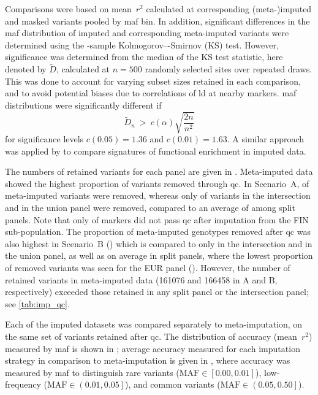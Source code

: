 Comparisons were based on mean~$r^2$ calculated at corresponding (meta-)imputed and masked variants pooled by \gls{maf} bin.
In addition, significant differences in the \gls{maf} distribution of imputed and corresponding meta-imputed variants were determined using the -sample Kolmogorov–-Smirnov (KS) test.
However, significance was determined from the median of the KS test statistic, here denoted by $\widetilde{D}$, calculated at ${n = \num{500}}$ randomly selected sites over  repeated draws.
This was done to account for varying subset sizes retained in each comparison, and to avoid potential biases due to correlations of \gls{ld} at nearby markers.
\Gls{maf} distributions were significantly different if
\begin{equation}\label{eq:meta_ks_test}
	\widetilde{D}_{n} ~ > ~ c(\alpha) \sqrt{\frac{2n}{n^2}}
\end{equation}
for significance levels ${c(0.05)=1.36}$ and ${c(0.01)=1.63}$.
A similar approach was applied by \citet{Pasaniuc:2014hq} to compare signatures of functional enrichment in imputed data.



%

%

The numbers of retained variants for each panel are given in .
Meta-imputed data showed the highest proportion of variants removed through \gls{qc}.
In Scenario~A,  of meta-imputed variants were removed, whereas only  of variants in the intersection and  in the union panel were removed, compared to an average of  among split panels.
Note that only  of markers did not pass \gls{qc} after imputation from the FIN sub-population.
The proportion of meta-imputed genotypes removed after \gls{qc} was also highest in Scenario~B () which is compared to only  in the intersection and  in the union panel, as well as  on average in split panels, where the lowest proportion of removed variants was seen for the EUR panel ().
However, the number of retained variants in meta-imputed data (\num{161076} and \num{166458} in A and B, respectively) exceeded those retained in any split panel or the intersection panel; see \cref{tab:imp_qc}.

%

%

Each of the imputed datasets was compared separately to meta-imputation, on the same set of variants retained after \gls{qc}.
The distribution of accuracy (mean~$r^2$) measured by \gls{maf} is shown in ; average accuracy measured for each imputation strategy in comparison to meta-imputation is given in , where accuracy was measured by \gls{maf} to distinguish
rare variants (${\text{MAF} \in \left[ 0.00, 0.01\right]}$),
low-frequency (${\text{MAF} \in \left( 0.01, 0.05\right]}$), and
common variants (${\text{MAF} \in \left( 0.05, 0.50\right]}$).

